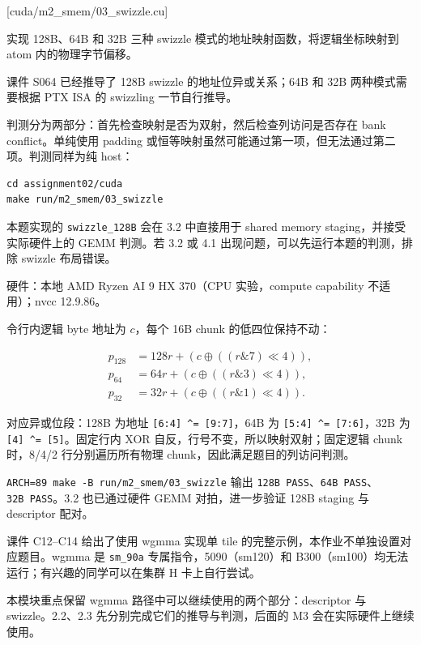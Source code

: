 \documentclass[11pt,a4paper,fontset=fandol]{ctexart}
\begin{document}
[cuda/m2\_smem/03\_swizzle.cu]

实现 128B、64B 和 32B 三种 swizzle 模式的地址映射函数，将逻辑坐标映射到
atom 内的物理字节偏移。

课件 S064 已经推导了 128B swizzle 的地址位异或关系；64B 和 32B
两种模式需要根据 PTX ISA 的 swizzling 一节自行推导。

判测分为两部分：首先检查映射是否为双射，然后检查列访问是否存在 bank
conflict。单纯使用 padding
或恒等映射虽然可能通过第一项，但无法通过第二项。判测同样为纯 host：

\begin{verbatim}
cd assignment02/cuda
make run/m2_smem/03_swizzle
\end{verbatim}

本题实现的 \texttt{swizzle\_\allowbreak{}128B} 会在 3.2 中直接用于
shared memory staging，并接受实际硬件上的 GEMM 判测。若 3.2 或 4.1
出现问题，可以先运行本题的判测，排除 swizzle 布局错误。

\begin{answer}

硬件：本地 AMD Ryzen AI 9 HX 370（CPU 实验，compute capability
不适用）；nvcc 12.9.86。

令行内逻辑 byte 地址为 \(c\)，每个 16B chunk 的低四位保持不动：

\[\begin{aligned}
p_{128}&=128r+(c\oplus((r\mathbin{\&}7)\ll4)),\\
p_{64}&=64r+(c\oplus((r\mathbin{\&}3)\ll4)),\\
p_{32}&=32r+(c\oplus((r\mathbin{\&}1)\ll4)).
\end{aligned}\]

对应异或位段：128B 为地址
\texttt{{[}6:\allowbreak{}4{]}\ \^{}=\allowbreak{}\ {[}9:\allowbreak{}7{]}}，64B
为
\texttt{{[}5:\allowbreak{}4{]}\ \^{}=\allowbreak{}\ {[}7:\allowbreak{}6{]}}，32B
为 \texttt{{[}4{]}\ \^{}=\allowbreak{}\ {[}5{]}}。固定行内 XOR
自反，行号不变，所以映射双射；固定逻辑 chunk 时，8/4/2
行分别遍历所有物理 chunk，因此满足题目的列访问判测。

\texttt{ARCH=\allowbreak{}89\ make\ -\allowbreak{}B\ run/\allowbreak{}m2\_\allowbreak{}smem/\allowbreak{}03\_\allowbreak{}swizzle}
输出 \texttt{128B\ PASS}、\texttt{64B\ PASS}、\texttt{32B\ PASS}。3.2
也已通过硬件 GEMM 对拍，进一步验证 128B staging 与 descriptor 配对。

\end{answer}

\begin{lookback}

课件 C12--C14 给出了使用 wgmma 实现单 tile
的完整示例，本作业不单独设置对应题目。wgmma 是
\texttt{sm\_\allowbreak{}90a} 专属指令，5090（sm120）和
B300（sm100）均无法运行；有兴趣的同学可以在集群 H 卡上自行尝试。

本模块重点保留 wgmma 路径中可以继续使用的两个部分：descriptor 与
swizzle。2.2、2.3 先分别完成它们的推导与判测，后面的 M3
会在实际硬件上继续使用。

\end{lookback}
\end{document}

